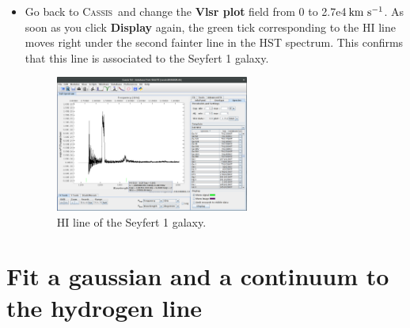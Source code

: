 \documentclass [a4paper, 12pt]{article}
\def\kms{\rm km\ s^{-1}}
\newcommand{\cassis}{{\textsc{Cassis}}}
\begin{document}
\begin{itemize}
\item Go back to \cassis\ and change the \textbf{Vlsr plot} field from 0 to 
2.7e4\,$\kms$. As soon as you click \textbf{Display} again, the green tick 
corresponding to the HI line moves right under the second fainter line in the 
HST spectrum. This confirms that this line is associated to the Seyfert 1 
galaxy.
\begin{figure}[H]
\center
\includegraphics[width=0.6\textwidth]{../images/cassis_redshifted_line.png}
\caption{HI line of the Seyfert 1 galaxy.}
\label{fig:spectrum3}
\end{figure}
\end{itemize}

\section{Fit a gaussian and a continuum to the hydrogen line}
\end{document}
